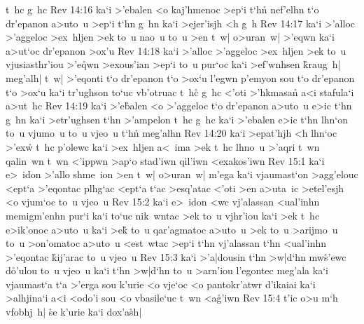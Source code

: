 t~hc
g~hc\bibvsend
\vs Rev 14:16
ka`i
>'ebalen
<o
kaj'hmenoc
>ep`i
t`hn\r{}
nef'elhn
t`o
dr'epanon
a>uto~u
>ep`i
t`hn
g~hn
ka`i
>ejer'isjh
<h
g~h\bibvsend
\vs Rev 14:17
ka`i
>'alloc
>'aggeloc
>ex~hljen
>ek
to~u
nao~u
to~u
>en
t~w|
o>uran~w|
>'eqwn
ka`i
a>ut`oc
dr'epanon
>ox'u\bibvsend
\vs Rev 14:18
ka`i
>'alloc
>'aggeloc
>ex~hljen
>ek
to~u
vjusiasthr'iou
>'e\r{q}wn
>exous'ian
>ep`i
to~u
pur`oc
ka`i
>ef'wnhsen
\r{k}raug~h|
meg'alh|
t~w|
>'eqonti
t`o
dr'epanon
t`o
>ox`u
l'egwn
p'emyon
sou
t`o
dr'epanon
t`o
>ox`u
ka`i
tr'ughson
to`uc
vb'otruac
t~hc\r{}
g~hc
<'oti
>'hkmasan\r{}
a<i
stafula`i
a>ut~hc\bibvsend
\vs Rev 14:19
ka`i
>'e\r{b}alen
<o
>'aggeloc
t`o
dr'epanon
a>uto~u
e>ic
t`hn
g~hn
ka`i
>etr'ughsen
t`hn
>'ampelon
t~hc
g~hc
ka`i
>'ebalen
e>ic
t`hn
lhn`on
to~u
vjumo~u
to~u
vjeo~u
t`hn\r{}
meg'alhn\bibvsend
\vs Rev 14:20
ka`i
>epat'hjh
<h
lhn`oc
>'ex\r{w}
t~hc
p'olewc
ka`i
>ex~hljen
a<~ima
>ek
t~hc
lhno~u
>'aqri
t~wn
qalin~wn
t~wn
<'ippwn
>ap`o
stad'iwn
qil'iwn
<exakos'iwn\bibvsend
\vs Rev 15:1
ka`i
e>~idon
>'allo
shme~ion
>en
t~w|
o>uran~w|
m'ega
ka`i
vjaumast`on
>agg'elouc
<ept`a
>'eqontac
plhg`ac
<ept`a
t`ac
>esq'atac
<'oti
>en
a>uta~ic
>etel'esjh
<o
vjum`oc
to~u
vjeo~u\bibvsend
\vs Rev 15:2
ka`i
e>~idon
<wc
vj'alassan
<ual'inhn
memigm'enhn
pur`i
ka`i
to`uc
nik~wntac
>ek
to~u
vjhr'iou
ka`i
>ek
t~hc
e>ik'onoc
a>uto~u
ka`i
>ek\r{}
to~u
qar'agmatoc
a>uto~u
>ek
to~u
>arijmo~u
to~u
>on'omatoc
a>uto~u
<est~wtac
>ep`i
t`hn
vj'alassan
t`hn
<ual'inhn
>'eqontac
\r{k}ij'arac
to~u
vjeo~u\bibvsend
\vs Rev 15:3
ka`i
>'a|dousin
t`hn
>w|d`hn
mw\r{s}'ewc
d\r{o}'ulou
to~u
vjeo~u
ka`i
t`hn
>w|d`hn
to~u
>arn'iou
l'egontec
meg'ala
ka`i
vjaumast`a
t`a
>'erga
sou
k'urie
<o
vje`oc
<o
pantokr'atwr
d'ikaiai
ka`i
>alhjina`i
a<i
<odo'i
sou
<o
vbasile`uc
t~wn
<a\r{g}'iwn\bibvsend
{}
\vs Rev 15:4
t'ic
o>u
m`h
vfobhj~h|
\r{s}e
k'urie
ka`i
dox'a\r{s}h|
